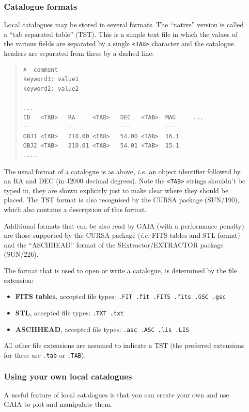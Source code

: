 \documentclass[twoside,11pt]{article}
\newcommand{\xref}[3]{#1}
\renewcommand{\_}{\texttt{\symbol{95}}}
\newcommand{\mytt}[1]{{\texttt{#1}}}
\newcommand{\mybold}[1]{{\textbf{#1}}}
\begin{document}
\subsubsection{Catalogue formats}
Local catalogues may be stored in several formats. The ``native''
version is called a ``tab separated table'' (TST). This is a simple
text file in which the values of the various fields are separated by a
single \mytt{<TAB>} character and the catalogue headers are separated
from these by a dashed line:
\begin{quote}
\begin{verbatim}
#  comment
keyword1: value1
keyword2: value2

...
ID   <TAB>   RA     <TAB>   DEC   <TAB>  MAG     ...
--           --             ---          ---
OBJ1 <TAB>   210.00 <TAB>   54.00 <TAB>  16.1
OBJ2 <TAB>   210.01 <TAB>   54.01 <TAB>  15.1
....
\end{verbatim}
\end{quote}
The usual format of a catalogue is as above, {\em i.e.} an object identifier
followed by an RA and DEC (in J2000 decimal degrees). Note the
\mytt{<TAB>} strings shouldn't be typed in, they are shown explicitly
just to make clear where they should be placed. The TST format is also
recognised by the CURSA package (\xref{SUN/190}{sun190}{}), which also
contains a description of this format.

Additional formats that can be also read by GAIA (with a performance
penalty) are those supported by the \xref{CURSA}{sun190}{} package
({\em i.e.} FITS-tables and STL format) and the ``ASCII\_HEAD'' format
of the SExtractor/EXTRACTOR package (\xref{SUN/226}{sun226}{}).

The format that is used to open or write a catalogue, is determined by
the file extension:
\begin{itemize}
\item \mybold{FITS tables}, accepted file types: \mytt{.FIT .fit .FITS .fits .GSC .gsc}
\item \mybold{STL}, accepted file types: \mytt{.TXT .txt}
\item \mybold{ASCII\_HEAD}, accepted file types: \mytt{.asc .ASC .lis .LIS}
\end{itemize}
All other file extensions are assumed to indicate a TST (the preferred
extensions for these are \mytt{.tab} or \mytt{.TAB}).

\subsubsection{Using your own local catalogues}
A useful feature of local catalogues is that you can create your own
and use GAIA to plot and manipulate them.
\end{document}
